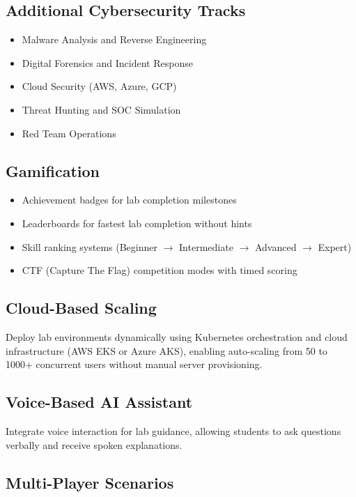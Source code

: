 \documentclass[12pt,a4paper]{report}
\begin{document}
\subsection{Additional Cybersecurity Tracks}
\begin{itemize}
  \item Malware Analysis and Reverse Engineering
  \item Digital Forensics and Incident Response
  \item Cloud Security (AWS, Azure, GCP)
  \item Threat Hunting and SOC Simulation
  \item Red Team Operations
\end{itemize}

\subsection{Gamification}
\begin{itemize}
  \item Achievement badges for lab completion milestones
  \item Leaderboards for fastest lab completion without hints
  \item Skill ranking systems (Beginner $\to$ Inter\-mediate $\to$ Advanced $\to$ Expert)
  \item CTF (Capture The Flag) competition modes with timed scoring
\end{itemize}

\subsection{Cloud-Based Scaling}

Deploy lab environments dynamically using Kubernetes orchestration and cloud infrastructure (AWS EKS
or Azure AKS), enabling auto-scaling from 50 to 1000+ concurrent users without manual server
provisioning.

\subsection{Voice-Based AI Assistant}

Integrate voice interaction for lab guidance, allowing students to ask questions verbally and receive
spoken explanations.

\subsection{Multi-Player Scenarios}
\end{document}

